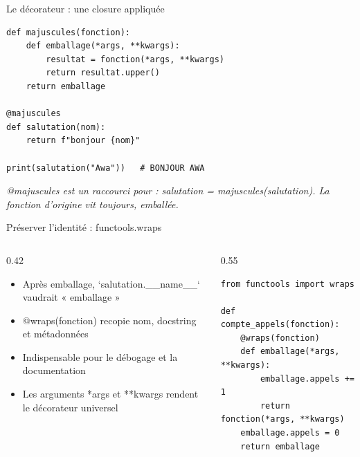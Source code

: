 \documentclass[aspectratio=169,11pt]{beamer}
\begin{document}
\begin{frame}[fragile]{Le décorateur : une closure appliquée}

\begin{lstlisting}[style=py]
def majuscules(fonction):
    def emballage(*args, **kwargs):
        resultat = fonction(*args, **kwargs)
        return resultat.upper()
    return emballage

@majuscules
def salutation(nom):
    return f"bonjour {nom}"

print(salutation("Awa"))   # BONJOUR AWA
\end{lstlisting}
\vspace{0.5pt}

{\small\color{PyGris}\itshape @majuscules est un raccourci pour : salutation = majuscules(salutation). La fonction d'origine vit toujours, emballée.}

\end{frame}

\begin{frame}[fragile]{Préserver l'identité : functools.wraps}
\begin{columns}[t]
\begin{column}{0.42\textwidth}
\begin{itemize}
  \setlength{\itemsep}{1.5pt}\setlength{\parskip}{0pt}
  \item Après emballage, `salutation.\_\_name\_\_` vaudrait « emballage »
  \item @wraps(fonction) recopie nom, docstring et métadonnées
  \item Indispensable pour le débogage et la documentation
  \item Les arguments *args et **kwargs rendent le décorateur universel
\end{itemize}
\end{column}
\hspace{0.02\textwidth}
\begin{column}{0.55\textwidth}
\begin{lstlisting}[style=pysmall]
from functools import wraps

def compte_appels(fonction):
    @wraps(fonction)
    def emballage(*args, **kwargs):
        emballage.appels += 1
        return fonction(*args, **kwargs)
    emballage.appels = 0
    return emballage
\end{lstlisting}
\end{column}
\end{columns}
\end{frame}
\end{document}
